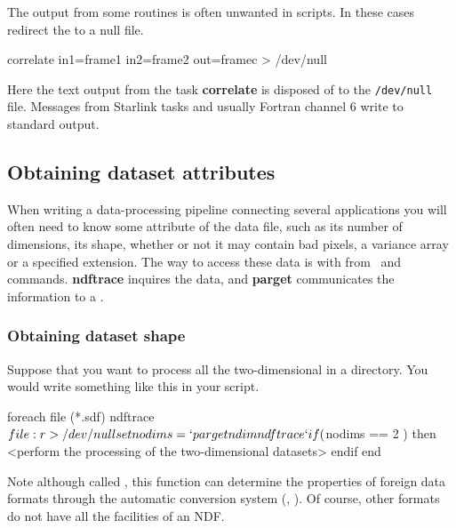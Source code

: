 \documentclass[twoside,11pt,nolof]{starlink}
\providecommand{\KAPPAref}{\xref{{\footnotesize KAPPA}}{sun95}{}}
\providecommand{\NDFrefa}[1]{\xref{#1}{sun33}{}}
\begin{document}
The output from some routines is often unwanted in scripts.  In these
cases redirect the  to a
null file.

\begin{small}
\begin{terminalv}
     correlate in1=frame1 in2=frame2 out=framec > /dev/null
\end{terminalv}
\end{small}
Here the text output from the task \textbf{correlate} is disposed of to
the \texttt{/dev/null} file.  Messages from Starlink tasks and usually
Fortran channel 6 write to \textsf{standard output}.

\newpage
\subsection{Obtaining dataset
attributes\label{sc4_se_dataset_attributes}}

When writing a data-processing pipeline connecting several applications
you will often need to know some attribute of the data file, such as
its number of dimensions, its shape, whether or not it may contain bad
pixels, a variance array or a specified extension.  The way to
access these data is with  from
\KAPPAref\ and  commands.
\textbf{ndftrace} inquires the data, and \textbf{parget} communicates the
information to a .

\subsubsection{Obtaining dataset shape
\label{sc4_se_dataset_shape}}

Suppose that you want to process all the two-dimensional \NDFrefa{{\sf
NDF}s} in a directory.  You would write something like this in your
script.

\begin{small}
\begin{terminalv}
     foreach file (*.sdf)
        ndftrace $file:r > /dev/null
        set nodims = `parget ndim ndftrace`
        if ( $nodims == 2 ) then
           <perform the processing of the two-dimensional datasets>
        endif
     end
\end{terminalv}
\end{small}

Note although called , this
function can determine the properties of foreign data formats through
the automatic conversion system (,
).  Of course, other formats do not have all the
facilities of an NDF.
\end{document}
